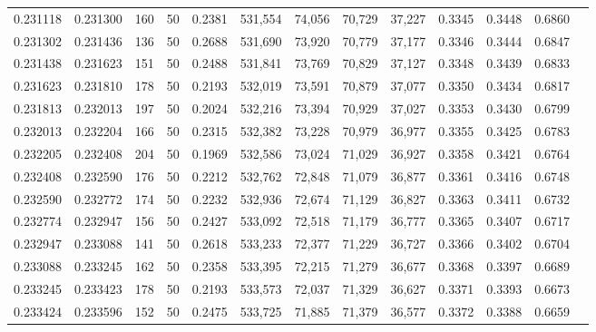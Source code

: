\begin{tabular}{rrrrrrrrrrrrr}
0.231118 & 0.231300 &   160 &  50 &                                     0.2381 & 531,554 &  74,056 &  70,729 &  37,227 & 0.3345 & 0.3448 & 0.6860 \\
0.231302 & 0.231436 &   136 &  50 &                                     0.2688 & 531,690 &  73,920 &  70,779 &  37,177 & 0.3346 & 0.3444 & 0.6847 \\
0.231438 & 0.231623 &   151 &  50 &                                     0.2488 & 531,841 &  73,769 &  70,829 &  37,127 & 0.3348 & 0.3439 & 0.6833 \\
0.231623 & 0.231810 &   178 &  50 &                                     0.2193 & 532,019 &  73,591 &  70,879 &  37,077 & 0.3350 & 0.3434 & 0.6817 \\
0.231813 & 0.232013 &   197 &  50 &                                     0.2024 & 532,216 &  73,394 &  70,929 &  37,027 & 0.3353 & 0.3430 & 0.6799 \\
0.232013 & 0.232204 &   166 &  50 &                                     0.2315 & 532,382 &  73,228 &  70,979 &  36,977 & 0.3355 & 0.3425 & 0.6783 \\
0.232205 & 0.232408 &   204 &  50 &                                     0.1969 & 532,586 &  73,024 &  71,029 &  36,927 & 0.3358 & 0.3421 & 0.6764 \\
0.232408 & 0.232590 &   176 &  50 &                                     0.2212 & 532,762 &  72,848 &  71,079 &  36,877 & 0.3361 & 0.3416 & 0.6748 \\
0.232590 & 0.232772 &   174 &  50 &                                     0.2232 & 532,936 &  72,674 &  71,129 &  36,827 & 0.3363 & 0.3411 & 0.6732 \\
0.232774 & 0.232947 &   156 &  50 &                                     0.2427 & 533,092 &  72,518 &  71,179 &  36,777 & 0.3365 & 0.3407 & 0.6717 \\
0.232947 & 0.233088 &   141 &  50 &                                     0.2618 & 533,233 &  72,377 &  71,229 &  36,727 & 0.3366 & 0.3402 & 0.6704 \\
0.233088 & 0.233245 &   162 &  50 &                                     0.2358 & 533,395 &  72,215 &  71,279 &  36,677 & 0.3368 & 0.3397 & 0.6689 \\
0.233245 & 0.233423 &   178 &  50 &                                     0.2193 & 533,573 &  72,037 &  71,329 &  36,627 & 0.3371 & 0.3393 & 0.6673 \\
0.233424 & 0.233596 &   152 &  50 &                                     0.2475 & 533,725 &  71,885 &  71,379 &  36,577 & 0.3372 & 0.3388 & 0.6659 \\

\end{tabular}
